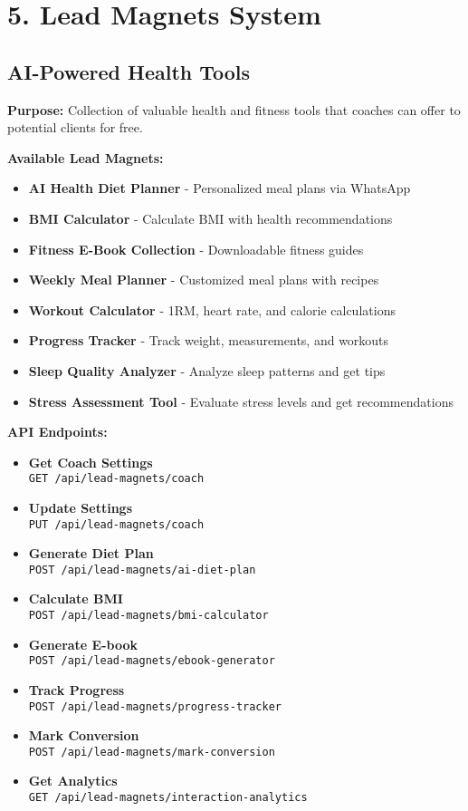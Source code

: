 \documentclass[12pt,a4paper]{article}
\newcommand{\apiendpoint}[2]{\textbf{#1} \\ \texttt{#2}}
\begin{document}
\section{5. Lead Magnets System}

\subsection{AI-Powered Health Tools}
\textbf{Purpose:} Collection of valuable health and fitness tools that coaches can offer to potential clients for free.

\textbf{Available Lead Magnets:}
\begin{itemize}
    \item \textbf{AI Health Diet Planner} - Personalized meal plans via WhatsApp
    \item \textbf{BMI Calculator} - Calculate BMI with health recommendations
    \item \textbf{Fitness E-Book Collection} - Downloadable fitness guides
    \item \textbf{Weekly Meal Planner} - Customized meal plans with recipes
    \item \textbf{Workout Calculator} - 1RM, heart rate, and calorie calculations
    \item \textbf{Progress Tracker} - Track weight, measurements, and workouts
    \item \textbf{Sleep Quality Analyzer} - Analyze sleep patterns and get tips
    \item \textbf{Stress Assessment Tool} - Evaluate stress levels and get recommendations
\end{itemize}

\textbf{API Endpoints:}
\begin{itemize}
    \item \apiendpoint{Get Coach Settings}{GET /api/lead-magnets/coach}
    \item \apiendpoint{Update Settings}{PUT /api/lead-magnets/coach}
    \item \apiendpoint{Generate Diet Plan}{POST /api/lead-magnets/ai-diet-plan}
    \item \apiendpoint{Calculate BMI}{POST /api/lead-magnets/bmi-calculator}
    \item \apiendpoint{Generate E-book}{POST /api/lead-magnets/ebook-generator}
    \item \apiendpoint{Track Progress}{POST /api/lead-magnets/progress-tracker}
    \item \apiendpoint{Mark Conversion}{POST /api/lead-magnets/mark-conversion}
    \item \apiendpoint{Get Analytics}{GET /api/lead-magnets/interaction-analytics}
\end{itemize}
\end{document}
